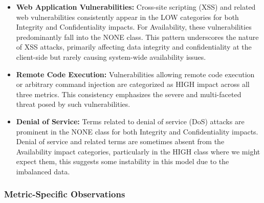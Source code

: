 \documentclass[12pt]{article}
\begin{document}
\begin{itemize}

	\item \textbf{Web Application Vulnerabilities:} Cross-site scripting (XSS) and related web
	      vulnerabilities consistently appear in the LOW categories for both Integrity and
	      Confidentiality impacts. For Availability, these vulnerabilities predominantly fall into the
	      NONE class. This pattern underscores the nature of XSS attacks, primarily affecting data
	      integrity and confidentiality at the client-side but rarely causing system-wide availability
	      issues.

	\item \textbf{Remote Code Execution:} Vulnerabilities allowing remote code execution or
	      arbitrary command injection are categorized as HIGH impact across all three metrics. This
	      consistency emphasizes the severe and multi-faceted threat posed by such vulnerabilities.

	\item \textbf{Denial of Service:} Terms related to denial of service (DoS) attacks are prominent
	      in the NONE class for both Integrity and Confidentiality impacts. Denial of service and
	      related terms are sometimes absent from the Availability impact categories, particularly in
	      the HIGH class where we might expect them, this suggests some instability in this model
	      due to the imbalanced data.

\end{itemize}

\subsubsection{Metric-Specific Observations}
\end{document}
